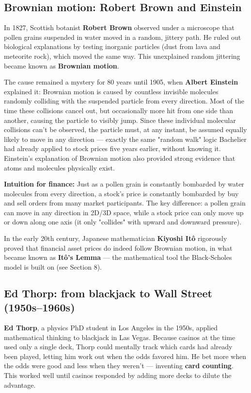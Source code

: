\documentclass[12pt,openany]{book}
\theoremstyle{definition}
\theoremstyle{remark}
\begin{document}
\subsection{Brownian motion: Robert Brown and Einstein}

In 1827, Scottish botanist \textbf{Robert Brown} observed under a microscope that pollen grains suspended in water moved in a random, jittery path. He ruled out biological explanations by testing inorganic particles (dust from lava and meteorite rock), which moved the same way. This unexplained random jittering became known as \textbf{Brownian motion}.

The cause remained a mystery for 80 years until 1905, when \textbf{Albert Einstein} explained it: Brownian motion is caused by countless invisible molecules randomly colliding with the suspended particle from every direction. Most of the time these collisions cancel out, but occasionally more hit from one side than another, causing the particle to visibly jump. Since these individual molecular collisions can't be observed, the particle must, at any instant, be assumed equally likely to move in any direction --- exactly the same "random walk" logic Bachelier had already applied to stock prices five years earlier, without knowing it. Einstein's explanation of Brownian motion also provided strong evidence that atoms and molecules physically exist.

\textbf{Intuition for finance:} Just as a pollen grain is constantly bombarded by water molecules from every direction, a stock's price is constantly bombarded by buy and sell orders from many market participants. The key difference: a pollen grain can move in any direction in 2D/3D space, while a stock price can only move up or down along one axis (it only "collides" with upward and downward pressure).

In the early 20th century, Japanese mathematician \textbf{Kiyoshi Itô} rigorously proved that financial asset prices do indeed follow Brownian motion, in what became known as \textbf{Itô's Lemma} --- the mathematical tool the Black-Scholes model is built on (see Section 8).

\subsection{Ed Thorp: from blackjack to Wall Street (1950s--1960s)}

\textbf{Ed Thorp}, a physics PhD student in Los Angeles in the 1950s, applied mathematical thinking to blackjack in Las Vegas. Because casinos at the time used only a single deck, Thorp could mentally track which cards had already been played, letting him work out when the odds favored him. He bet more when the odds were good and less when they weren't --- inventing \textbf{card counting}. This worked well until casinos responded by adding more decks to dilute the advantage.
\end{document}
